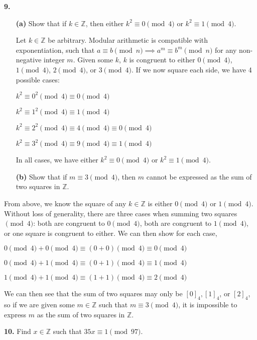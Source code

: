 \documentclass[12pt]{amsart}
\def\ZZ{{\mathbb Z}}
\begin{document}
{\bf 9.} \begin{itemize}
\item[{\bf (a)}] Show that if $k\in\ZZ$, then either $k^2\equiv0\pmod{4}$ or $k^2\equiv1\pmod{4}$.

\medskip
Let $k\in\ZZ$ be arbitrary. Modular arithmetic is compatible with exponentiation, such that $a \equiv b\pmod{n} \implies a^m \equiv b^m \pmod{n}$ for any non-negative integer $m$. Given some $k$, $k$ is congruent to either $0 \pmod{4}$, $1\pmod{4}$, $2\pmod{4}$, or $3\pmod{4}$. If we now square each side, we have 4 possible cases:

\smallskip

$k^2 \equiv 0^2\pmod{4} \equiv 0\pmod{4}$

\smallskip
$k^2 \equiv 1^2\pmod{4} \equiv 1\pmod{4}$

\smallskip
$k^2 \equiv 2^2\pmod{4} \equiv 4\pmod{4} \equiv 0\pmod{4}$

\smallskip
$k^2 \equiv 3^2\pmod{4} \equiv 9\pmod{4} \equiv 1\pmod{4}$
\smallskip

In all cases, we have either $k^2 \equiv 0\pmod{4}$ or $k^2 \equiv 1\pmod{4}$.

\medskip

\item[{\bf (b)}] Show that if $m\equiv3\pmod{4}$, then $m$ cannot be expressed as the sum of two squares in $\ZZ$.
\end{itemize}

From above, we know the square of any $k\in\ZZ$ is either $0\pmod{4}$ or $1\pmod{4}$. Without loss of generality, there are three cases when summing two squares $\pmod{4}$: both are congruent to $0\pmod{4}$, both are congruent to $1\pmod{4}$, or one square is congruent to either. We can then show for each case,

$0\pmod{4} + 0\pmod{4} \equiv (0 + 0) \pmod{4} \equiv 0\pmod{4}$

\smallskip
$0\pmod{4} + 1\pmod{4} \equiv (0 + 1)\pmod{4} \equiv 1\pmod{4}$

\smallskip
$1\pmod{4} + 1\pmod{4} \equiv (1 + 1)\pmod{4} \equiv 2\pmod{4}$

\smallskip
We can then see that the sum of two squares may only be $[0]_4, [1]_4$, or $[2]_4$, so if we are given some $m\in\ZZ$ such that $m\equiv 3\pmod{4}$, it is impossible to express $m$ as the sum of two squares in $\ZZ$.
\medskip

{\bf 10.} Find $x\in\ZZ$ such that $35x\equiv1\pmod{97}$.

\medskip
\end{document}
